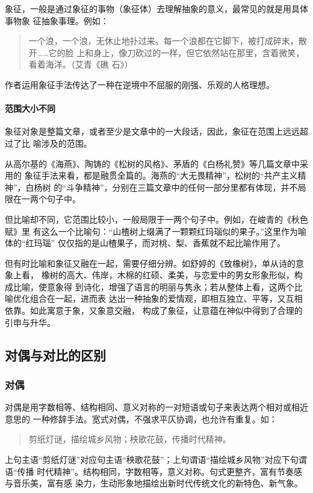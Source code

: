 \documentclass[final,oneside]{ctexbook}
\newenvironment{equotation}{\begin{quotation}\kaishu}{\end{quotation}}
\begin{document}
象征，一般是通过象征的事物（象征体）去理解抽象的意义，最常见的就是用具体事物象
征抽象事理。例如：
\begin{equotation}
  一个浪，一个浪，无休止地扑过来。每一个浪都在它脚下，被打成碎末，散开……它的脸
  上和身上，像刀砍过的一样，但它依然站在那里，含着微笑，看着海洋。（艾青《礁
  石》）
\end{equotation}
作者运用象征手法传达了一种在逆境中不屈服的刚强、乐观的人格理想。

\paragraph{范围大小不同}

象征对象是整篇文章，或者至少是文章中的一大段话，因此，象征在范围上远远超过了比
喻涉及的范围。

从高尔基的《海燕》、陶铸的《松树的风格》、茅盾的《白杨礼赞》等几篇文章中采用的
象征手法来看，都是融贯全篇的。海燕的“大无畏精神”，松树的“共产主义精神”，白杨树
的“斗争精神”，分别在三篇文章中的任何一部分里都有体现，并不局限在一两个句子中。

但比喻却不同，它范围比较小，一般局限于一两个句子中。例如，在峻青的《秋色赋》里
有这么一个比喻句：“山楂树上缀满了一颗颗红玛瑙似的果子。”这里作为喻体的“红玛瑙”
仅仅指的是山楂果子，而对桃、梨、香蕉就不起比喻作用了。

但有时比喻和象征又融在一起，需要仔细分辨。如舒婷的《致橡树》，单从诗的意象上看，
橡树的高大、伟岸，木棉的红硕、柔美，与恋爱中的男女形象形似，构成比喻，使意象得
到诗化，增强了语言的明丽与隽永；若从整体上看，这两个比喻优化组合在一起，进而表
达出一种抽象的爱情观，即相互独立、平等，又互相依靠。如此寓意于象，又象意交融，
构成了象征，让意蕴在神似中得到了合理的引申与升华。

\subsection{对偶与对比的区别}

\subsubsection{对偶}

对偶是用字数相等、结构相同、意义对称的一对短语或句子来表达两个相对或相近意思的
一种修辞手法。宽式对偶，不强求平仄协调，也允许有重复。如：
\begin{equotation}
  剪纸灯谜，描绘城乡风物；秧歌花鼓，传播时代精神。
\end{equotation}
上句主语“剪纸灯谜”对应句主语“秧歌花鼓”；上句谓语“描绘城乡风物”对应下句谓语“传播
时代精神”。结构相同，字数相等，意义对称。句式更整齐，富有节奏感与音乐美，富有感
染力，生动形象地描绘出新时代传统文化的新特色、新气象。
\end{document}
